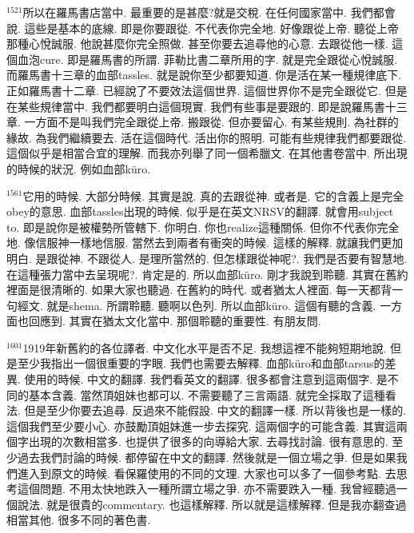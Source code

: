 \documentclass{book}
\begin{document}
$^{1521}$所以在羅馬書店當中.
最重要的是甚麼?就是交稅.
在任何國家當中.
我們都會說.
這些是基本的底線.
即是你要跟從.
不代表你完全地.
好像跟從上帝.
聽從上帝那種心悅誠服.
他說甚麼你完全照做.
甚至你要去追尋他的心意.
去跟從他一樣.
這個血泡cure.
即是羅馬書的所謂.
菲勒比書二章所用的字.
就是完全跟從心悅誠服.
而羅馬書十三章的血部tassles.
就是說你至少都要知道.
你是活在某一種規律底下.
正如羅馬書十二章.
已經說了不要效法這個世界.
這個世界你不是完全跟從它.
但是在某些規律當中.
我們都要明白這個現實.
我們有些事是要跟的.
即是說羅馬書十三章.
一方面不是叫我們完全跟從上帝.
搬跟從.
但亦要留心.
有某些規則.
為社群的緣故.
為我們繼續要去.
活在這個時代.
活出你的照明.
可能有些規律我們都要跟從.
這個似乎是相當合宜的理解.
而我亦列舉了同一個希臘文.
在其他書卷當中.
所出現的時候的狀況.
例如血部küro.

$^{1561}$它用的時候.
大部分時候.
其實是說.
真的去跟從神.
或者是.
它的含義上是完全obey的意思.
血部tassles出現的時候.
似乎是在英文NRSV的翻譯.
就會用subject to.
即是說你是被權勢所管轄下.
你明白.
你也realize這種關係.
但你不代表你完全地.
像信服神一樣地信服.
當然去到兩者有衝突的時候.
這樣的解釋.
就讓我們更加明白.
是跟從神.
不跟從人.
是理所當然的.
但怎樣跟從神呢?.
我們是否要有智慧地.
在這種張力當中去呈現呢?.
肯定是的.
所以血部küro.
剛才我說到聆聽.
其實在舊約裡面是很清晰的.
如果大家也聽過.
在舊約的時代.
或者猶太人裡面.
每一天都背一句經文.
就是shema.
所謂聆聽.
聽啊以色列.
所以血部küro.
這個有聽的含義.
一方面也回應到.
其實在猶太文化當中.
那個聆聽的重要性.
有朋友問.

$^{1601}$1919年新舊約的各位譯者.
中文化水平是否不足.
我想這裡不能夠短期地說.
但是至少我指出一個很重要的字眼.
我們也需要去解釋.
血部küro和血部tarsus的差異.
使用的時候.
中文的翻譯.
我們看英文的翻譯.
很多都會注意到這兩個字.
是不同的基本含義.
當然頂姐妹也都可以.
不需要聽了三言兩語.
就完全採取了這種看法.
但是至少你要去追尋.
反過來不能假設.
中文的翻譯一樣.
所以背後也是一樣的.
這個我們至少要小心.
亦鼓勵頂姐妹進一步去探究.
這兩個字的可能含義.
其實這兩個字出現的次數相當多.
也提供了很多的向導給大家.
去尋找討論.
很有意思的.
至少過去我們討論的時候.
都停留在中文的翻譯.
然後就是一個立場之爭.
但是如果我們進入到原文的時候.
看保羅使用的不同的文理.
大家也可以多了一個參考點.
去思考這個問題.
不用太快地跌入一種所謂立場之爭.
亦不需要跌入一種.
我曾經聽過一個說法.
就是很貴的commentary.
也這樣解釋.
所以就是這樣解釋.
但是我亦翻查過相當其他.
很多不同的著色書.
\end{document}
